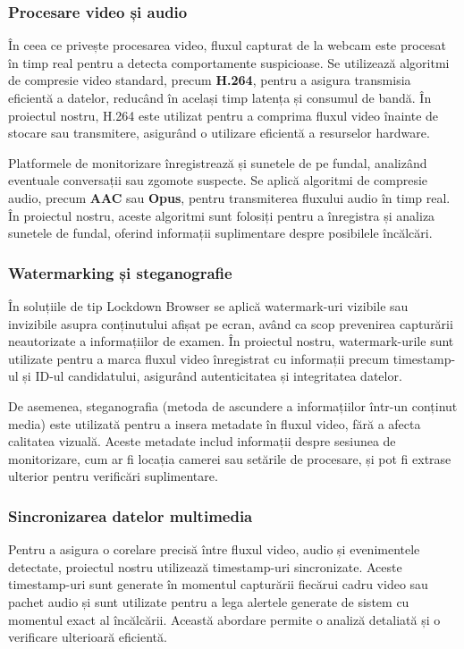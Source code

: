 \documentclass[12pt,a4paper]{article}
\begin{document}
\subsubsection{Procesare video și audio}
În ceea ce privește procesarea video, fluxul capturat de la webcam este procesat în
timp real pentru a detecta comportamente suspicioase. Se utilizează algoritmi de
compresie video standard, precum \textbf{H.264}, pentru a asigura transmisia
eficientă a datelor, reducând în același timp latența și consumul de
bandă. În proiectul nostru, H.264 este utilizat pentru a comprima fluxul video înainte de stocare sau transmitere, asigurând o utilizare eficientă a resurselor hardware.

Platformele de monitorizare înregistrează și sunetele de pe fundal, analizând 
eventuale conversații sau zgomote suspecte. Se aplică algoritmi de compresie audio, 
precum \textbf{AAC} sau \textbf{Opus}, pentru transmiterea fluxului audio în timp real. În proiectul nostru, aceste algoritmi sunt folosiți pentru a înregistra și analiza sunetele de fundal, oferind informații suplimentare despre posibilele încălcări.

\subsubsection{Watermarking și steganografie}
În soluțiile de tip Lockdown Browser se aplică watermark-uri vizibile sau invizibile 
asupra conținutului afișat pe ecran, având ca scop prevenirea capturării neautorizate 
a informațiilor de examen. În proiectul nostru, watermark-urile sunt utilizate pentru a marca fluxul video înregistrat cu informații precum timestamp-ul și ID-ul candidatului, asigurând autenticitatea și integritatea datelor.

De asemenea, steganografia (metoda de ascundere a informațiilor 
într-un conținut media) este utilizată pentru a insera metadate în fluxul video, fără a afecta calitatea vizuală. Aceste metadate includ informații despre sesiunea de monitorizare, cum ar fi locația camerei sau setările de procesare, și pot fi extrase ulterior pentru verificări suplimentare.

\subsubsection{Sincronizarea datelor multimedia}
Pentru a asigura o corelare precisă între fluxul video, audio și evenimentele detectate, proiectul nostru utilizează timestamp-uri sincronizate. Aceste timestamp-uri sunt generate în momentul capturării fiecărui cadru video sau pachet audio și sunt utilizate pentru a lega alertele generate de sistem cu momentul exact al încălcării. Această abordare permite o analiză detaliată și o verificare ulterioară eficientă.
\end{document}
